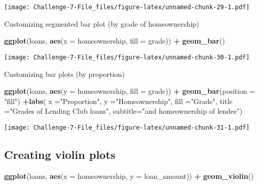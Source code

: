 \documentclass[
]{article}
\newenvironment{Shaded}{\begin{snugshade}}{\end{snugshade}}
\newcommand{\AttributeTok}[1]{\textcolor[rgb]{0.13,0.29,0.53}{#1}}
\newcommand{\FunctionTok}[1]{\textcolor[rgb]{0.13,0.29,0.53}{\textbf{#1}}}
\newcommand{\NormalTok}[1]{#1}
\newcommand{\SpecialCharTok}[1]{\textcolor[rgb]{0.81,0.36,0.00}{\textbf{#1}}}
\newcommand{\StringTok}[1]{\textcolor[rgb]{0.31,0.60,0.02}{#1}}
\begin{document}
\texttt{[image: Challenge-7-File\_files/figure-latex/unnamed-chunk-29-1.pdf]}

Customizing segmented bar plot (by grade of homeownership)

\begin{Shaded}
\begin{Highlighting}[]
\FunctionTok{ggplot}\NormalTok{(loans, }\FunctionTok{aes}\NormalTok{(}\AttributeTok{x =}\NormalTok{ homeownership,}
\AttributeTok{fill =}\NormalTok{ grade)) }\SpecialCharTok{+}
\FunctionTok{geom\_bar}\NormalTok{()}
\end{Highlighting}
\end{Shaded}

\texttt{[image: Challenge-7-File\_files/figure-latex/unnamed-chunk-30-1.pdf]}

Customizing bar plots (by proportion)

\begin{Shaded}
\begin{Highlighting}[]
\FunctionTok{ggplot}\NormalTok{(loans, }\FunctionTok{aes}\NormalTok{(}\AttributeTok{y =}\NormalTok{ homeownership, }\AttributeTok{fill =}\NormalTok{ grade)) }\SpecialCharTok{+} \FunctionTok{geom\_bar}\NormalTok{(}\AttributeTok{position =}
\StringTok{"fill"}\NormalTok{) }\SpecialCharTok{+}\FunctionTok{labs}\NormalTok{( }\AttributeTok{x =}\StringTok{"Proportion"}\NormalTok{, }\AttributeTok{y =}\StringTok{"Homeownership"}\NormalTok{, }\AttributeTok{fill =}\StringTok{"Grade"}\NormalTok{, }\AttributeTok{title =}\StringTok{"Grades of Lending Club loans"}\NormalTok{, }\AttributeTok{subtitle=}\StringTok{"and homeownership of lendee"}\NormalTok{)}
\end{Highlighting}
\end{Shaded}

\texttt{[image: Challenge-7-File\_files/figure-latex/unnamed-chunk-31-1.pdf]}

\hypertarget{creating-violin-plots}{%
\subsection{Creating violin plots}\label{creating-violin-plots}}

\begin{Shaded}
\begin{Highlighting}[]
\FunctionTok{ggplot}\NormalTok{(loans, }\FunctionTok{aes}\NormalTok{(}\AttributeTok{x =}\NormalTok{ homeownership, }\AttributeTok{y =}\NormalTok{ loan\_amount)) }\SpecialCharTok{+}
\FunctionTok{geom\_violin}\NormalTok{()}
\end{Highlighting}
\end{Shaded}
\end{document}
